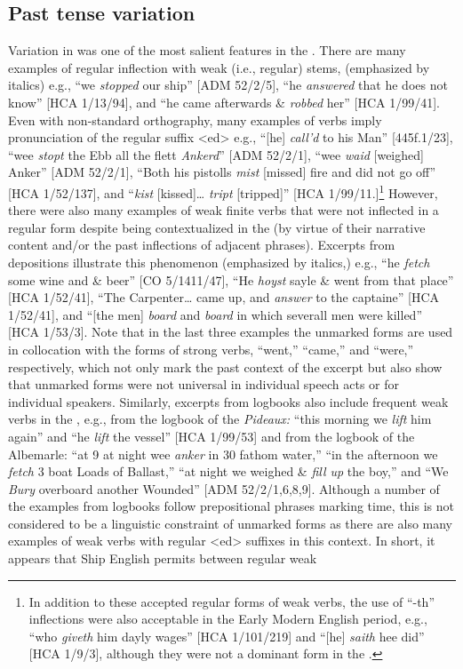 \subsection{{Past tense variation} }\label{sec:6.2.2}

Variation in  was one of the most salient features in the . There are many examples of regular inflection with weak (i.e., regular)  stems, (emphasized by italics) e.g., “we \textit{stopped} our ship” [ADM 52/2/5], “he \textit{answered} that he does not know” [HCA 1/13/94], and “he came afterwards \&  \textit{robbed} her” [HCA 1/99/41]. Even with non-standard orthography, many examples of verbs imply pronunciation of the regular  suffix <ed> e.g., “[he] \textit{call’d} to his Man” [445f.1/23], “wee \textit{stopt} the Ebb all the flett \textit{Ankerd}” [ADM 52/2/1], “wee \textit{waid} [weighed] Anker” [ADM 52/2/1], “Both his pistolls \textit{mist} [missed] fire and did not go off” [HCA 1/52/137], and “\textit{kist} [kissed]… \textit{tript} [tripped]” [HCA 1/99/11.]\footnote{In addition to these accepted regular forms of  weak verbs, the use of “-th” inflections were also acceptable in the Early Modern English period, e.g., “who \textit{giveth} him dayly wages” [HCA 1/101/219] and “[he] \textit{saith} hee did” [HCA 1/9/3], although they were not a dominant form in the .} However, there were also many examples of weak finite verbs that were not inflected in a regular  form despite being contextualized in the  (by virtue of their narrative content and/or the past inflections of adjacent  phrases). Excerpts from depositions illustrate this phenomenon (emphasized by italics,) e.g., “he \textit{fetch} some wine and \& beer” [CO 5/1411/47], “He \textit{hoyst} sayle \& went from that place” [HCA 1/52/41], “The Carpenter… came up, and \textit{answer} to the captaine” [HCA 1/52/41], and “[the men] \textit{board} and \textit{board} in which severall men were killed” [HCA 1/53/3]. Note that in the last three examples the unmarked forms are used in collocation with the  forms of strong verbs, “went,” “came,” and “were,” respectively, which not only mark the past context of the excerpt but also show that unmarked forms were not universal in individual speech acts or for individual speakers. Similarly, excerpts from logbooks also include frequent  weak verbs in the , e.g., from the logbook of the \textit{Pideaux:} “this morning we \textit{lift} him again” and “he \textit{lift} the vessel” [HCA 1/99/53] and from the logbook of the Albemarle: “at 9 at night wee \textit{anker} in 30 fathom water,” “in the afternoon we \textit{fetch} 3 boat Loads of Ballast,” “at night we weighed \& \textit{fill up} the boy,” and “We \textit{Bury} overboard another Wounded” [ADM 52/2/1,6,8,9]. Although a number of the examples from logbooks follow prepositional phrases marking time, this is not considered to be a linguistic constraint of unmarked  forms as there are also many examples of weak verbs with regular <ed> suffixes in this context. In short, it appears that Ship English permits  between regular weak 